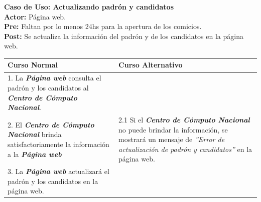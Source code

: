 \documentclass[spanish, 10pt,a4paper]{article}
\numberwithin{equation}{section} %
\begin{document}
\noindent\textbf{Caso de Uso: Actualizando padrón y candidatos}\\
\textbf{Actor: } Página web.\\
\textbf{Pre: } Faltan por lo menos 24hs para la apertura de los comicios.\\
\textbf{Post: } Se actualiza la información del padrón y de los candidatos en la página web.\\
\begin{table}[H]
  \centering
  \begin{tabular}{p{9cm} | p{7cm}}
    \hline
    Curso Normal & Curso Alternativo \\
    \hline
    \hline    
    1. La \textbf{\textit{Página web}} consulta el padrón y los candidatos al \textbf{\textit{Centro de Cómputo Nacional}}. 
    & \\
    
    \hline
    2. El \textbf{\textit{Centro de Cómputo Nacional}} brinda satisfactoriamente la información a la \textbf{\textit{Página web}}
    & 
    2.1 Si el \textbf{\textit{Centro de Cómputo Nacional}} no puede brindar la información, se mostrará un mensaje de \textit{''Error de actualización de padrón y candidatos''} en la página web.
    \\
    
    \hline
    3. La \textbf{\textit{Página web}} actualizará el padrón y los candidatos en la página web.
    & \\
    \hline
  \end{tabular}
\end{table}
\end{document}
